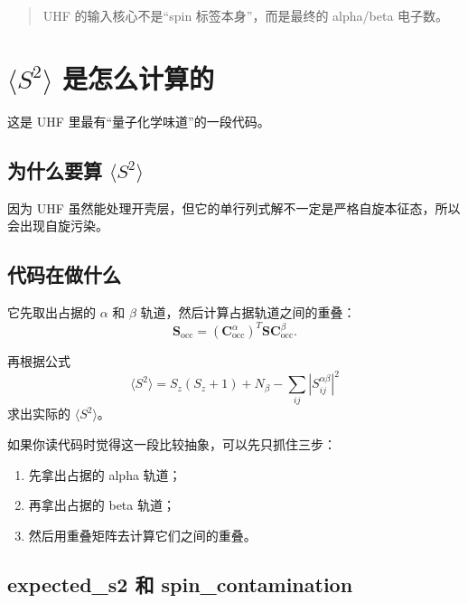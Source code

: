 \documentclass[UTF8,11pt,fontset=fandol]{ctexbook}
\begin{document}
\begin{quote}
UHF 的输入核心不是“spin 标签本身”，而是最终的 alpha/beta 电子数。
\end{quote}

\section{\texorpdfstring{$\langle S^2\rangle$}{<S\string^2>} 是怎么计算的}



这是 UHF 里最有“量子化学味道”的一段代码。

\subsection*{为什么要算 \texorpdfstring{$\langle S^2\rangle$}{<S\string^2>}}

因为 UHF 虽然能处理开壳层，但它的单行列式解不一定是严格自旋本征态，所以会出现自旋污染。

\subsection*{代码在做什么}

它先取出占据的 $\alpha$ 和 $\beta$ 轨道，然后计算占据轨道之间的重叠：
\begin{equation}
\mathbf{S}_{\mathrm{occ}} = (\mathbf{C}^{\alpha}_{\mathrm{occ}})^T \mathbf{S}\mathbf{C}^{\beta}_{\mathrm{occ}}.
\end{equation}

再根据公式
\begin{equation}
\langle S^2 \rangle = S_z(S_z+1)+N_{\beta}-\sum_{ij}\left|S^{\alpha\beta}_{ij}\right|^2
\end{equation}
求出实际的 $\langle S^2\rangle$。

如果你读代码时觉得这一段比较抽象，可以先只抓住三步：
\begin{enumerate}[label=\arabic*.]
  \item 先拿出占据的 alpha 轨道；
  \item 再拿出占据的 beta 轨道；
  \item 然后用重叠矩阵去计算它们之间的重叠。
\end{enumerate}

\subsection*{expected\_s2 和 spin\_contamination}
\end{document}
